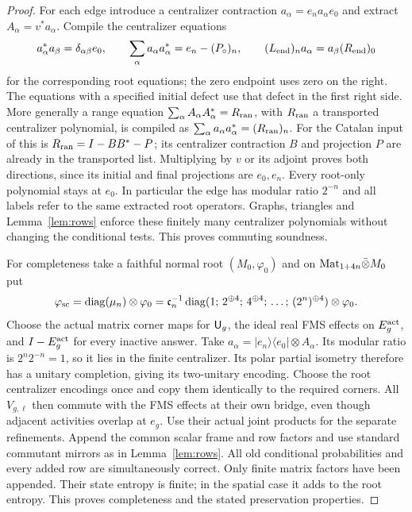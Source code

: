 \begin{proof}
For each edge introduce a centralizer contraction $a_\alpha=e_na_\alpha e_0$ and extract $A_\alpha=v^*a_\alpha$. Compile the centralizer equations
\[
 a_\alpha^*a_\beta=\delta_{\alpha\beta}e_0,\qquad
 \sum_\alpha a_\alpha a_\alpha^*=e_n-(P_\circ)_n,
 \qquad (L_{\rm end})_na_\alpha=a_\beta (R_{\rm end})_0
\]
for the corresponding root equations; the zero endpoint uses zero on the right. The equations with a specified initial defect use that defect in the first right side. More generally a range equation $\sum_\alpha A_\alpha A_\alpha^*=R_{\rm ran}$, with $R_{\rm ran}$ a transported centralizer polynomial, is compiled as $\sum_\alpha a_\alpha a_\alpha^*=(R_{\rm ran})_n$. For the Catalan input of \cite[Section 6]{Entropy} this is $R_{\rm ran}=I-BB^*-P$; its centralizer contraction $B$ and projection $P$ are already in the transported list. Multiplying by $v$ or its adjoint proves both directions, since its initial and final projections are $e_0,e_n$. Every root-only polynomial stays at $e_0$. In particular the edge has modular ratio $2^{-n}$ and all labels refer to the same extracted root operators. Graphs, triangles and Lemma~\ref{lem:rows} enforce these finitely many centralizer polynomials without changing the conditional tests. This proves commuting soundness.

For completeness take a faithful normal root $(M_0,\varphi_0)$ and on $\mathrm{Mat}_{1+4n}\bar\otimes M_0$ put
\[
 \varphi_{\rm sc}=\operatorname{diag}(\mu_n)\otimes\varphi_0
 =\mathfrak c_n^{-1}\operatorname{diag}
 (1;\,2^{\oplus4};\,4^{\oplus4};\,\ldots;\,(2^n)^{\oplus4})
 \otimes\varphi_0.
\]
Choose the actual matrix corner maps for ${\mathsf U}_g$, the ideal real FMS effects on $E^{\rm act}_g$, and $I-E^{\rm act}_g$ for every inactive answer. Take $a_\alpha=|e_n\rangle\langle e_0|\otimes A_\alpha$. Its modular ratio is $2^n2^{-n}=1$, so it lies in the finite centralizer. Its polar partial isometry therefore has a unitary completion, giving its two-unitary encoding. Choose the root centralizer encodings once and copy them identically to the required corners. All $V_{g,\ell}$ then commute with the FMS effects at their own bridge, even though adjacent activities overlap at $e_g$. Use their actual joint products for the separate refinements. Append the common scalar frame and row factors and use standard commutant mirrors as in Lemma~\ref{lem:rows}. All old conditional probabilities and every added row are simultaneously correct. Only finite matrix factors have been appended. Their state entropy is finite; in the spatial case it adds to the root entropy. This proves completeness and the stated preservation properties.
\end{proof}

